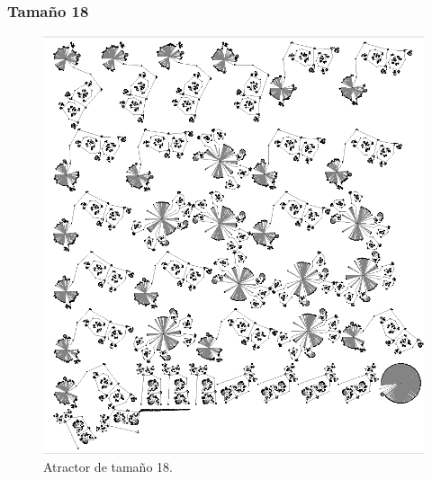 \documentclass[11pt]{article}
\begin{document}
			\subsubsection{Tamaño 18}
			\begin{figure}[H]
			\centering
			\includegraphics[scale=0.7]{resources/Atractores22/atractor_22_size_18.png}
			\caption{Atractor de tamaño 18.}\label{fig:picture}
			\end{figure}
\end{document}
